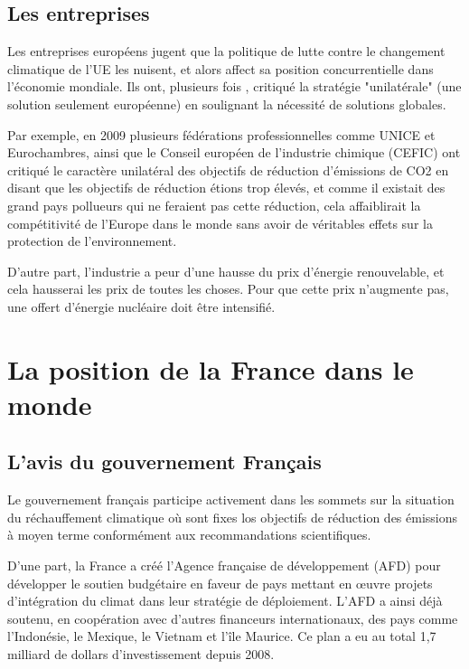 \documentclass[a4paper,10pt]{article}
\begin{document}
\subsection{Les entreprises}

Les entreprises européens jugent que la politique  de  lutte  contre  le
changement climatique de l'UE les nuisent, et alors affect sa position concurrentielle dans l'économie
mondiale. Ils  ont, plusieurs  fois , critiqué  la stratégie  "unilatérale" (une
solution seulement européenne) en
soulignant la nécessité de solutions globales.

Par  exemple, en  2009  plusieurs fédérations  professionnelles  comme UNICE  et
Eurochambres, ainsi que le Conseil  européen de l'industrie chimique (CEFIC) ont
critiqué le caractère  unilatéral des objectifs de réduction  d'émissions de CO2
en  disant que  les  objectifs de  réduction  étions trop  élevés,  et comme  il
existait des grand  pays pollueurs qui ne feraient pas  cette réduction, cela
affaiblirait la compétitivité de l'Europe dans le monde sans avoir de véritables effets sur la
protection de l'environnement.

D'autre part, l'industrie a peur d'une hausse du prix d'énergie renouvelable, et
cela hausserai  les prix de  toutes les choses.  Pour que cette  prix n'augmente
pas, une offert d'énergie nucléaire doit être intensifié.


\section{La position de la France dans le monde}

\subsection{L’avis du gouvernement  Français}

Le gouvernement français participe activement dans les sommets sur la situation du réchauffement climatique où sont fixes los objectifs de réduction des émissions à moyen terme conformément aux recommandations scientifiques. 

D'une part, la France a créé l’Agence française de développement (AFD) pour développer le soutien budgétaire en faveur de pays mettant en œuvre projets d’intégration du climat dans leur stratégie de déploiement. L’AFD a ainsi déjà soutenu, en coopération avec d’autres financeurs internationaux, des pays comme l’Indonésie, le Mexique, le Vietnam et l’île Maurice. Ce plan a eu au total 1,7 milliard de dollars d’investissement depuis 2008.
\end{document}
